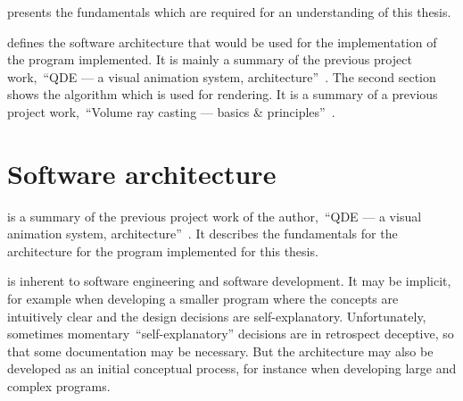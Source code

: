 \documentclass[%
    a4paper,    %
    justified,  %
    nobib,      %
    openany     %
]{tufte-book}
\begin{document}
 presents the fundamentals which are required for
an understanding of this thesis.

 defines the software architecture
that would be used for the implementation of the program implemented. It is
mainly a summary of the previous project work,~\enquote{QDE --- a visual
animation system, architecture}~\cite{osterwalder-qde-2016}. The second section
shows the algorithm which is used for rendering. It is a summary of a previous
project work,~\enquote{Volume ray casting --- basics \&
principles}~\cite{osterwalder-volume-2016}.

\section{Software architecture}
\label{soarch}

 is a summary of the previous project work of the
author,~\enquote{QDE --- a visual animation system,
architecture}~\cite{osterwalder-qde-2016}. It describes the fundamentals for the
architecture for the program implemented for this thesis.

 is inherent to software engineering and
software development. It may be implicit, for example when developing a smaller
program where the concepts are intuitively clear and the design decisions are
self-explanatory. Unfortunately, sometimes momentary~\enquote{self-explanatory}
decisions are in retrospect deceptive, so that some documentation may be
necessary. But the architecture may also be developed as an initial conceptual
process, for instance when developing large and complex programs.
\end{document}
